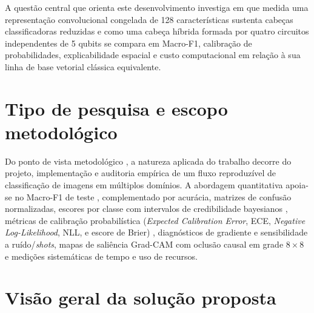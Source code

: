 \documentclass[
    12pt,
    openright,
    oneside,
    a4paper,
    english,
    brazil
]{abntex2}
\begin{document}
A questão central que orienta este desenvolvimento investiga em que medida uma representação convolucional congelada de 128 características sustenta cabeças classificadoras reduzidas e como uma cabeça híbrida formada por quatro circuitos independentes de 5 qubits se compara em Macro-F1, calibração de probabilidades, explicabilidade espacial e custo computacional em relação à sua linha de base vetorial clássica equivalente.

\section{Tipo de pesquisa e escopo metodológico}

Do ponto de vista metodológico \cite{Wazlawick2020}, a natureza aplicada do trabalho decorre do projeto, implementação e auditoria empírica de um fluxo reproduzível de classificação de imagens em múltiplos domínios. A abordagem quantitativa apoia-se no Macro-F1 de teste \cite{fawcett2006roc,hand2001simple,sokolova2009systematic}, complementado por acurácia, matrizes de confusão normalizadas, escores por classe com intervalos de credibilidade bayesianos \cite{wang2019bayestest}, métricas de calibração probabilística (\textit{Expected Calibration Error}, ECE, \textit{Negative Log-Likelihood}, NLL, e escore de Brier) \cite{guo2017calibration}, diagnósticos de gradiente e sensibilidade a ruído/\textit{shots}, mapas de saliência Grad-CAM \cite{selvaraju2020gradcam} com oclusão causal em grade \(8 \times 8\) e medições sistemáticas de tempo e uso de recursos.

\section{Visão geral da solução proposta}
\label{subsec:visao_arquitetura}
\end{document}
